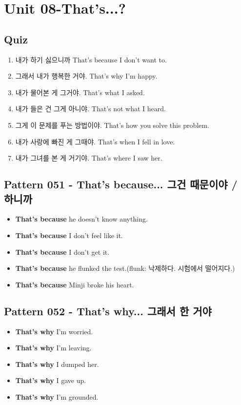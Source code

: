 \documentclass[11pt]{oblivoir}
\begin{document}
\section{Unit 08-That's...?}
\subsection{Quiz}
\begin{enumerate}
  \color{red} \item 내가 하기 싫으니까
    \color{light-gray} That's because I don't want to.
  \color{red} \item 그래서 내가 행복한 거야.
    \color{light-gray} That's why I'm happy.
  \color{red} \item 내가 물어본 게 그거야.
    \color{light-gray} That's what I asked.
  \color{red} \item 내가 들은 건 그게 아니야.
    \color{light-gray} That's not what I heard.
  \color{red} \item 그게 이 문제를 푸는 방법이야.
    \color{light-gray} That's how you solve this problem.
  \color{red} \item 내가 사랑에 빠진 게 그때야.
    \color{light-gray} That's when I fell in love.
   \color{red} \item 내가 그녀를 본 게 거기야.
    \color{light-gray} That's where I saw her.
\end{enumerate}

\subsection{Pattern 051 - That's because... 그건 \texttildelow 때문이야 / \texttildelow 하니까}
\begin{itemize}
  \item \textbf{That's because} he doesn't know anything.
  \item \textbf{That's because} I don't feel like it.
  \item \textbf{That's because} I don't get it.
  \item \textbf{That's because} he flunked the test.(flunk: 낙제하다. 시험에서 떨어지다.)
  \item \textbf{That's because} Minji broke his heart.
\end{itemize}

\subsection{Pattern 052 - That's why... 그래서 \texttildelow 한 거야}
\begin{itemize}
  \item \textbf{That's why} I'm worried.
  \item \textbf{That's why} I'm leaving.
  \item \textbf{That's why} I dumped her.
  \item \textbf{That's why} I gave up.
  \item \textbf{That's why} I'm grounded.
\end{itemize}
\end{document}

